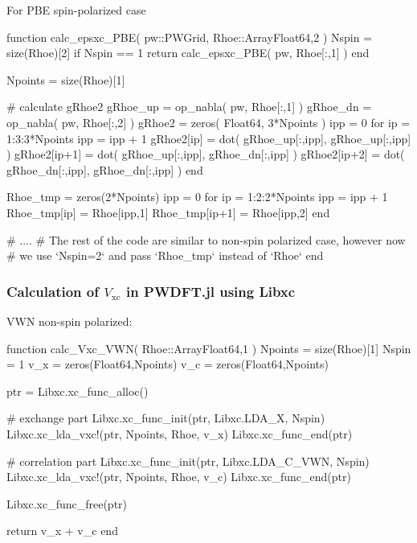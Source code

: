 For PBE spin-polarized case

\begin{juliacode}
function calc_epsxc_PBE( pw::PWGrid, Rhoe::Array{Float64,2} )
    Nspin = size(Rhoe)[2]
    if Nspin == 1
        return calc_epsxc_PBE( pw, Rhoe[:,1] )
    end

    Npoints = size(Rhoe)[1]

    # calculate gRhoe2
    gRhoe_up = op_nabla( pw, Rhoe[:,1] )
    gRhoe_dn = op_nabla( pw, Rhoe[:,2] )
    gRhoe2 = zeros( Float64, 3*Npoints )
    ipp = 0
    for ip = 1:3:3*Npoints
        ipp = ipp + 1
        gRhoe2[ip]   = dot( gRhoe_up[:,ipp], gRhoe_up[:,ipp] )
        gRhoe2[ip+1] = dot( gRhoe_up[:,ipp], gRhoe_dn[:,ipp] )
        gRhoe2[ip+2] = dot( gRhoe_dn[:,ipp], gRhoe_dn[:,ipp] )
    end

    Rhoe_tmp = zeros(2*Npoints)
    ipp = 0
    for ip = 1:2:2*Npoints
        ipp = ipp + 1
        Rhoe_tmp[ip] = Rhoe[ipp,1]
        Rhoe_tmp[ip+1] = Rhoe[ipp,2]
    end

    # ....
    # The rest of the code are similar to non-spin polarized case, however now
    # we use `Nspin=2` and pass `Rhoe_tmp` instead of `Rhoe`
end
\end{juliacode}


\subsubsection{Calculation of $V_{\mathrm{xc}}$ in \textsf{PWDFT.jl} using Libxc}

VWN non-spin polarized:
\begin{juliacode}
function calc_Vxc_VWN( Rhoe::Array{Float64,1} )
    Npoints = size(Rhoe)[1]
    Nspin = 1
    v_x = zeros(Float64,Npoints)
    v_c = zeros(Float64,Npoints)

    ptr = Libxc.xc_func_alloc()

    # exchange part
    Libxc.xc_func_init(ptr, Libxc.LDA_X, Nspin)
    Libxc.xc_lda_vxc!(ptr, Npoints, Rhoe, v_x)
    Libxc.xc_func_end(ptr)

    # correlation part
    Libxc.xc_func_init(ptr, Libxc.LDA_C_VWN, Nspin)
    Libxc.xc_lda_vxc!(ptr, Npoints, Rhoe, v_c)
    Libxc.xc_func_end(ptr)

    Libxc.xc_func_free(ptr)

    return v_x + v_c
end
\end{juliacode}


